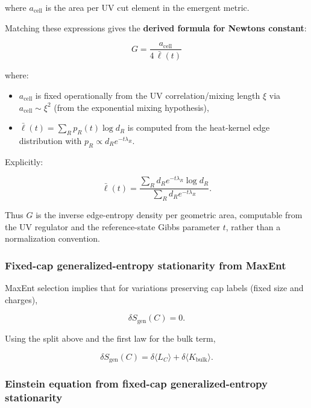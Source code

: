 where \(a_{\mathrm{cell}}\) is the area per UV cut element in the emergent metric.

Matching these expressions gives the \textbf{derived formula for Newton\textquotesingle s constant}:

\[
G = \frac{a_{\mathrm{cell}}}{4 \, \bar{\ell}(t)}
\]

where:

\begin{itemize}
\tightlist
\item
  \(a_{\mathrm{cell}}\) is fixed operationally from the UV correlation/mixing length \(\xi\) via \(a_{\mathrm{cell}} \sim \xi^2\) (from the exponential mixing hypothesis),
\item
  \(\bar{\ell}(t) = \sum_R p_R(t) \log d_R\) is computed from the heat-kernel edge distribution with \(p_R \propto d_R e^{-t\lambda_R}\).
\end{itemize}

Explicitly:

\[
\bar{\ell}(t) = \frac{\sum_R d_R e^{-t\lambda_R} \log d_R}{\sum_R d_R e^{-t\lambda_R}}.
\]

Thus \(G\) is the inverse edge-entropy density per geometric area, computable from the UV regulator and the reference-state Gibbs parameter \(t\), rather than a normalization convention.

\subsubsection{Fixed-cap generalized-entropy stationarity from MaxEnt}\label{55-entanglement-equilibrium-from-maxent}

MaxEnt selection implies that for variations preserving cap labels (fixed size and charges),

\[
\delta S_{\mathrm{gen}}(C) = 0.
\]

Using the split above and the first law for the bulk term,

\[
\delta S_{\mathrm{gen}}(C) = \delta \langle L_C \rangle + \delta \langle K_{\mathrm{bulk}} \rangle.
\]

\subsubsection{Einstein equation from fixed-cap generalized-entropy stationarity}\label{56-einstein-equation-from-cap-equilibrium}

